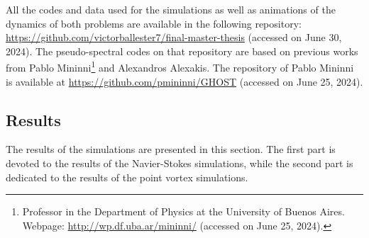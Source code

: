 \documentclass[../main.tex]{subfiles}
\begin{document}
\newcommand{\theoldfootnote}{\thefootnote}
\renewcommand{\thefootnote}{\fnsymbol{footnote}}
All the codes and data used for the simulations as well as animations of the dynamics of both problems are available in the following repository: \url{https://github.com/victorballester7/final-master-thesis} (accessed on June 30, 2024). The pseudo-spectral codes on that repository are based on previous works from Pablo Mininni\footnote[3]{Professor in the Department of Physics at the University of Buenos Aires. Webpage: \url{http://wp.df.uba.ar/mininni/} (accessed on June 25, 2024).} and Alexandros Alexakis. The repository of Pablo Mininni is available at \url{https://github.com/pmininni/GHOST} (accessed on June 25, 2024).
\renewcommand{\thefootnote}{\theoldfootnote}
\subsection{Results}\label{sec:results}
The results of the simulations are presented in this section. The first part is devoted to the results of the Navier-Stokes simulations, while the second part is dedicated to the results of the point vortex simulations.
\end{document}
